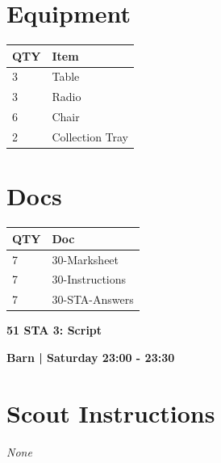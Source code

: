 \documentclass[10pt]{article}
\newcommand{\newtitle}[1]{\begin{center}{\Huge\bfseries #1 }\\ \vspace{5mm}\end{center}}
\newcommand{\newsubtitle}[1]{\begin{center}{\color{grey}\Large\bfseries #1 }\\ \vspace{5mm}\end{center}}
\begin{document}
	\begin{multicols}{2}

		\section*{\faWrench \: Equipment}

		
	\begin{center}
			\begin{tabular}{p{2cm}p{4cm}}


				\textbf{QTY} & \textbf{Item} \\\toprule
												3&Table\\\midrule
												3&Radio\\\midrule
												6&Chair\\\midrule
												2&Collection Tray\\\midrule
								\end{tabular}

			\end{center}

		
		\vfill\null
		\columnbreak

			\section*{\faFile \: Docs}
		 	\begin{center}
			\begin{tabular}{p{2cm}p{4cm}}

			\textbf{QTY} & \textbf{Doc} \\\toprule
										7&30-Marksheet\\\midrule
										7&30-Instructions\\\midrule
										7&30-STA-Answers\\\midrule
							\end{tabular}
			\end{center}
	

		\vfill\null

		\end{multicols}



	\vspace{1cm}


	\clearpage
		\newtitle{51 STA 3: Script }
	\newsubtitle{Barn | Saturday 23:00 - 23:30}
		\setcounter{section}{50}
	\section*{Scout Instructions}
		\textit{None}
	
\end{document}
